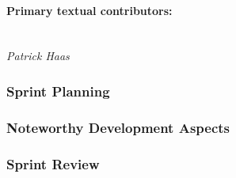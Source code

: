 \paragraph{Primary textual contributors:}
\mbox{}\\\emph{Patrick Haas}

\subsubsection{Sprint Planning}


\subsubsection{Noteworthy Development Aspects}


\subsubsection{Sprint Review}

